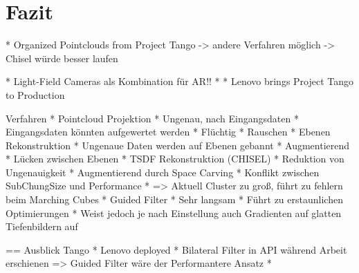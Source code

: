 \chapter{Fazit}

* Organized Pointclouds from Project Tango
	-> andere Verfahren möglich
	-> Chisel würde besser laufen

* Light-Field Cameras als Kombination für AR!!
* 
* Lenovo brings Project Tango to Production


Verfahren
* Pointcloud Projektion
	* Ungenau, nach Eingangsdaten
	* Eingangsdaten könnten aufgewertet werden
	* Flüchtig
	* Rauschen
* Ebenen Rekonstruktion
	* Ungenaue Daten werden auf Ebenen gebannt
	* Augmentierend
	* Lücken zwischen Ebenen 
* TSDF Rekonstruktion (CHISEL)
	* Reduktion von Ungenauigkeit
	* Augmentierend durch Space Carving
	* Konflikt zwischen SubChungSize und Performance
	* => Aktuell Cluster zu groß, führt zu fehlern beim Marching Cubes
* Guided Filter
	* Sehr langsam
	* Führt zu erstaunlichen Optimierungen
	* Weist jedoch je nach Einstellung auch Gradienten auf glatten Tiefenbildern auf





== Ausblick Tango
* Lenovo deployed
* Bilateral Filter in API während Arbeit erschienen => Guided Filter wäre der Performantere Ansatz
* 
	
	
	
